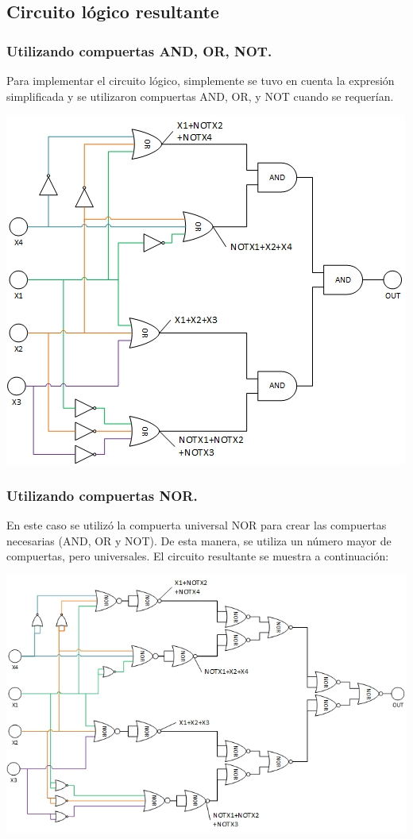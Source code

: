 \subsection{Circuito lógico resultante}
\subsubsection{Utilizando compuertas AND, OR, NOT.}
Para implementar el circuito lógico, simplemente se tuvo en cuenta la expresión simplificada y se utilizaron compuertas AND, OR, y NOT cuando se requerían.
\begin{center}
	\includegraphics[scale=0.75]{ej2.jpg}
\end{center}

\subsubsection{Utilizando compuertas NOR.}

En este caso se utilizó la compuerta universal NOR para crear las compuertas necesarias (AND, OR y NOT).
De esta manera, se utiliza un número mayor de compuertas, pero universales. El circuito resultante se muestra a continuación:
\begin{center}
\includegraphics[scale=0.75]{ej2b.jpg}
\end{center}

